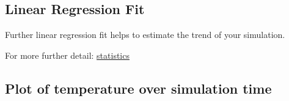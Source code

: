 \documentclass[
  letterpaper,
]{article}
\begin{document}
\hypertarget{linear-regression-fit}{%
\subsection{Linear Regression Fit}\label{linear-regression-fit}}

Further linear regression fit helps to estimate the trend of your
simulation.

For more further detail:
\protect\hyperlink{statistical-excursion}{statistics}

\hypertarget{plot-of-temperature-over-simulation-time}{%
\subsection{Plot of temperature over simulation
time}\label{plot-of-temperature-over-simulation-time}}
\end{document}
